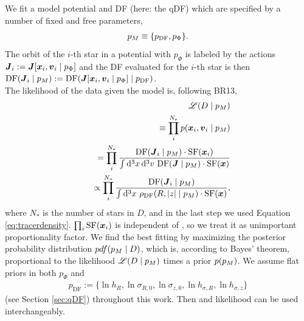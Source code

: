We fit a model potential and DF (here: the qDF) which are specified by a number of fixed and free parameters,
\begin{eqnarray*}
p_M \equiv \{ p_\text{DF} , p_\Phi \}.
\end{eqnarray*}
The orbit of the $i$-th star in a potential with $p_\Phi$ is labeled by the actions $\boldsymbol{J}_i := \boldsymbol{J}[\boldsymbol{x}_i,\boldsymbol{v}_i\mid p_{\Phi}]$ and the DF evaluated for the $i$-th star is then $\text{DF}(\boldsymbol{J}_i \mid p_M) := \text{DF}(\boldsymbol{J}[\boldsymbol{x}_i,\boldsymbol{v}_i\mid p_{\Phi}] \mid p_\text{DF})$.\\

The likelihood of the data given the model is, following BR13,
\begin{eqnarray}
&&\mathscr{L}(D \mid p_M) \nonumber\\
&&\equiv \prod_i^{N_*} p(\boldsymbol{x}_i,\boldsymbol{v}_i \mid p_M) \nonumber\\
&&= \prod_i^{N_*} \frac{\text{DF}(\boldsymbol{J}_i \mid p_M) \cdot \text{SF}(\boldsymbol{x}_i)}{\int \mathop{}\!\mathrm{d^3} x \mathop{}\!\mathrm{d^3} v \  \text{DF}(\boldsymbol{J} \mid p_M) \cdot \text{SF}(\boldsymbol{x})}\nonumber\\
&&\propto \prod_i^{N_*} \frac{\text{DF}(\boldsymbol{J}_i \mid p_M)}{\int \mathop{}\!\mathrm{d^3} x \  \rho_\text{DF}(R,|z| \mid p_M) \cdot \text{SF}(\boldsymbol{x})}, \label{eq:prob}
\end{eqnarray}
where $N_*$ is the number of stars in $D$, and in the last step we used Equation \ref{eq:tracerdensity}. $\prod_i\text{SF}(\boldsymbol{x}_i)$ is independent of \pmodel{}, so we treat it as unimportant proportionality factor. We find the best fitting \pmodel{} by maximizing the posterior probability distribution $pdf{}(p_M \mid D)$, which is, according to Bayes' theorem, proportional to the likelihood $\mathscr{L}(D\mid p_M)$ times a prior $p(p_M)$. We assume flat priors in both $p_\Phi$ and
\begin{eqnarray}
p_\text{DF} := \{ \ln h_R, \ln \sigma_{R,0}, \ln \sigma_{z,0}, \ln h_{\sigma,R}, \ln h_{\sigma,z} \} \label{eq:p_DF}
\end{eqnarray}
(see Section \ref{sec:qDF}) throughout this work. Then \pdf{} and likelihood can be used interchangeably.\\

